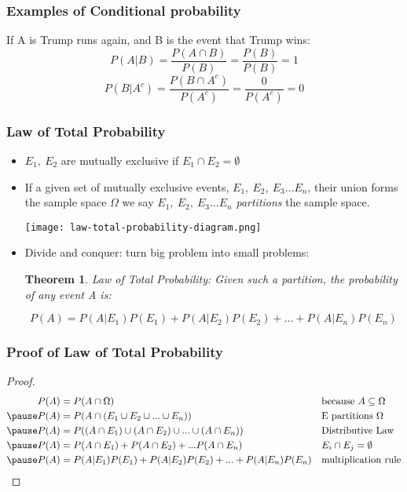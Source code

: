 \documentclass[aspectratio=169, handout]{beamer}
\newtheorem{thm}{Theorem}
\numberwithin{equation}{section}
\begin{document}
\begin{frame}
\frametitle{Examples of Conditional probability}
If A is Trump runs again, and B is the event that Trump wins:
$$P(A|B)=\frac{P(A\cap B)}{P(B)}=\frac{P(B)}{P(B)}=1$$\pause
$$P(B|A^c)=\frac{P(B\cap A^c)}{P(A^c)}=\frac{0}{P(A^c)}=0$$

\end{frame}



\begin{frame}
\frametitle{Law of Total Probability}

\begin{itemize}
\item $E_1,\  E_2$ are mutually exclusive if $E_1\cap E_2=\emptyset$

\item If a given set of mutually exclusive events, $E_1,\  E_2,\ E_3\ldots E_n$, their union forms the sample space $\Omega$ we say $E_1,\  E_2,\ E_3 \ldots E_n$ \emph{partitions} the sample space. \\ 
\begin{center}
\texttt{[image: law-total-probability-diagram.png]}
\end{center}
\item Divide and conquer: turn big problem into small problems:
\begin{thm}
Law of Total Probability: 
Given such a partition, the probability of any event A is:

$$P(A)= P(A|E_1)P(E_1)+P(A|E_2)P(E_2)+...+P(A|E_n)P(E_n)$$
\end{thm}
\end{itemize}

\end{frame}


\begin{frame}
\frametitle{Proof of Law of Total Probability}
\begin{proof} 
\begin{align*}
P(A) &= P(A\cap \Omega) && \text{because }A\subseteq \Omega \\\pause
P(A) &= P(A\cap (E_1\cup E_2 \cup ... \cup E_n))  && \text{E partitions }\Omega \\\pause
P(A) &= P((A\cap E_1)\cup (A\cap E_2) \cup ... \cup(A\cap E_n))  && \text{Distributive Law}\\ \pause
P(A) &=  P(A\cap E_1)+ P(A\cap E_2) + ...P(A\cap E_n)&& E_i\cap E_j=\emptyset\\\pause
P(A) &=  P(A|E_1)P(E_1)+P(A|E_2)P(E_2)+...+P(A|E_n)P(E_n)&&\text{multiplication rule}
\end{align*}

\end{proof}

\end{frame}
\end{document}
